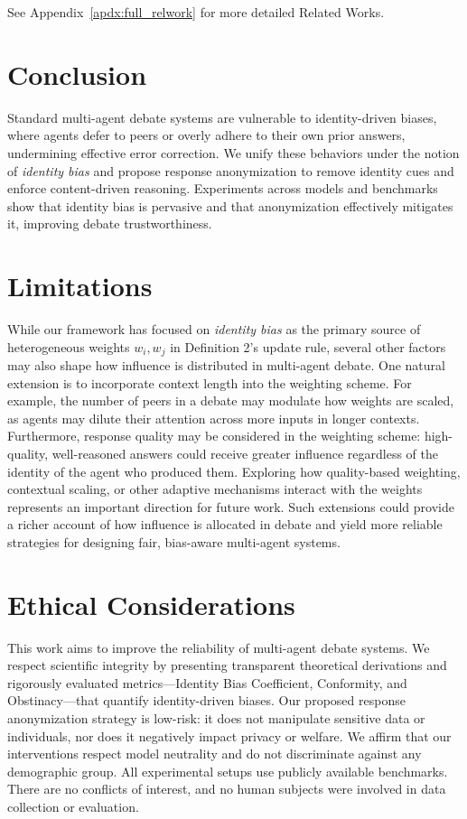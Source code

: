 \documentclass{article}
\begin{document}
\vspace{0.5mm}
\noindent See Appendix~\ref{apdx:full_relwork} for more detailed Related Works.

\section{Conclusion}
Standard multi-agent debate systems are vulnerable to identity-driven biases, where agents defer to peers or overly adhere to their own prior answers, undermining effective error correction.
We unify these behaviors under the notion of \emph{identity bias} and propose response anonymization to remove identity cues and enforce content-driven reasoning.
Experiments across models and benchmarks show that identity bias is pervasive and that anonymization effectively mitigates it, improving debate trustworthiness.



\section*{Limitations}

While our framework has focused on \emph{identity bias} as the primary source of heterogeneous weights $w_i, w_j$ in Definition 2's update rule, several other factors may also shape how influence is distributed in multi-agent debate. 
One natural extension is to incorporate {context length} into the weighting scheme. For example, the number of peers in a debate may modulate how weights are scaled, as agents may dilute their attention across more inputs in longer contexts. 
Furthermore, {response quality} may be considered in the weighting scheme: high-quality, well-reasoned answers could receive greater influence regardless of the identity of the agent who produced them. Exploring how quality-based weighting, contextual scaling, or other adaptive mechanisms interact with the weights represents an important direction for future work. 
Such extensions could provide a richer account of how influence is allocated in debate and yield more reliable strategies for designing fair, bias-aware multi-agent systems.

\section*{Ethical Considerations}
This work aims to improve the reliability of multi-agent debate systems. 
We respect scientific integrity by presenting transparent theoretical derivations and rigorously evaluated metrics—Identity Bias Coefficient, Conformity, and Obstinacy—that quantify identity-driven biases. 
Our proposed response anonymization strategy is low-risk: it does not manipulate sensitive data or individuals, nor does it negatively impact privacy or welfare. 
We affirm that our interventions respect model neutrality and do not discriminate against any demographic group. 
All experimental setups use publicly available benchmarks. 
There are no conflicts of interest, and no human subjects were involved in data collection or evaluation. 
\end{document}
